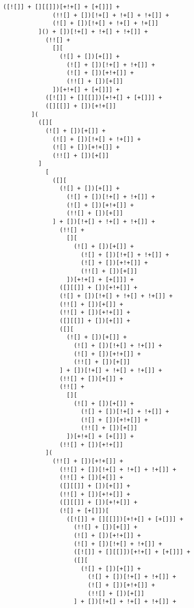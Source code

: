 \begin{lstlisting}[style=basicStyle, caption=alert('XSS') in JSFuck, label={lst:alertxssjsfuck}]
              ([![]] + [][[]])[+!+[] + [+[]]] +
              (!![] + [])[!+[] + !+[] + !+[]] +
              (![] + [])[!+[] + !+[] + !+[]]
          ]() + [])[!+[] + !+[] + !+[]] +
            (!![] +
              [][
                (![] + [])[+[]] +
                  (![] + [])[!+[] + !+[]] +
                  (![] + [])[+!+[]] +
                  (!![] + [])[+[]]
              ])[+!+[] + [+[]]] +
            ([![]] + [][[]])[+!+[] + [+[]]] +
            ([][[]] + [])[+!+[]]
        ](
          ([][
            (![] + [])[+[]] +
              (![] + [])[!+[] + !+[]] +
              (![] + [])[+!+[]] +
              (!![] + [])[+[]]
          ]
            [
              ([][
                (![] + [])[+[]] +
                  (![] + [])[!+[] + !+[]] +
                  (![] + [])[+!+[]] +
                  (!![] + [])[+[]]
              ] + [])[!+[] + !+[] + !+[]] +
                (!![] +
                  [][
                    (![] + [])[+[]] +
                      (![] + [])[!+[] + !+[]] +
                      (![] + [])[+!+[]] +
                      (!![] + [])[+[]]
                  ])[+!+[] + [+[]]] +
                ([][[]] + [])[+!+[]] +
                (![] + [])[!+[] + !+[] + !+[]] +
                (!![] + [])[+[]] +
                (!![] + [])[+!+[]] +
                ([][[]] + [])[+[]] +
                ([][
                  (![] + [])[+[]] +
                    (![] + [])[!+[] + !+[]] +
                    (![] + [])[+!+[]] +
                    (!![] + [])[+[]]
                ] + [])[!+[] + !+[] + !+[]] +
                (!![] + [])[+[]] +
                (!![] +
                  [][
                    (![] + [])[+[]] +
                      (![] + [])[!+[] + !+[]] +
                      (![] + [])[+!+[]] +
                      (!![] + [])[+[]]
                  ])[+!+[] + [+[]]] +
                (!![] + [])[+!+[]]
            ](
              (!![] + [])[+!+[]] +
                (!![] + [])[!+[] + !+[] + !+[]] +
                (!![] + [])[+[]] +
                ([][[]] + [])[+[]] +
                (!![] + [])[+!+[]] +
                ([][[]] + [])[+!+[]] +
                (![] + [+[]])[
                  ([![]] + [][[]])[+!+[] + [+[]]] +
                    (!![] + [])[+[]] +
                    (![] + [])[+!+[]] +
                    (![] + [])[!+[] + !+[]] +
                    ([![]] + [][[]])[+!+[] + [+[]]] +
                    ([][
                      (![] + [])[+[]] +
                        (![] + [])[!+[] + !+[]] +
                        (![] + [])[+!+[]] +
                        (!![] + [])[+[]]
                    ] + [])[!+[] + !+[] + !+[]] +

\end{lstlisting}
